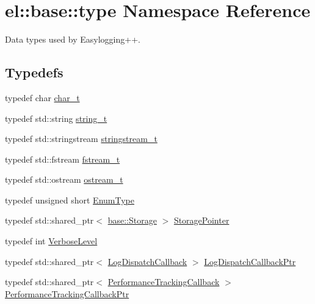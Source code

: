 \hypertarget{namespaceel_1_1base_1_1type}{}\section{el\+:\+:base\+:\+:type Namespace Reference}
\label{namespaceel_1_1base_1_1type}


Data types used by Easylogging++.  


\subsection*{Typedefs}
\begin{DoxyCompactItemize}
\item 
typedef char \hyperlink{namespaceel_1_1base_1_1type_ae9fe1ba101c2444b8cad9a2484b54907}{char\+\_\+t}
\item 
typedef std\+::string \hyperlink{namespaceel_1_1base_1_1type_a67e406cd213c231f1d135b5a4eda64b5}{string\+\_\+t}
\item 
typedef std\+::stringstream \hyperlink{namespaceel_1_1base_1_1type_a3492908c4b80f97b6c4b346d394f1302}{stringstream\+\_\+t}
\item 
typedef std\+::fstream \hyperlink{namespaceel_1_1base_1_1type_a620c830ead75d26b45c060c211ee2685}{fstream\+\_\+t}
\item 
typedef std\+::ostream \hyperlink{namespaceel_1_1base_1_1type_a74ea109bf34d1c44926837fb0830f445}{ostream\+\_\+t}
\item 
typedef unsigned short \hyperlink{namespaceel_1_1base_1_1type_afb892a99b7545bf6e45c1e1d84af2ec9}{Enum\+Type}
\item 
typedef std\+::shared\+\_\+ptr$<$ \hyperlink{classel_1_1base_1_1_storage}{base\+::\+Storage} $>$ \hyperlink{namespaceel_1_1base_1_1type_a3c34822c3825018aca1526f2289b7976}{Storage\+Pointer}
\item 
typedef int \hyperlink{namespaceel_1_1base_1_1type_a3f79fa74639a13c32f794ba074fe7fb4}{Verbose\+Level}
\item 
typedef std\+::shared\+\_\+ptr$<$ \hyperlink{classel_1_1_log_dispatch_callback}{Log\+Dispatch\+Callback} $>$ \hyperlink{namespaceel_1_1base_1_1type_a887283511935c7a6d5ca99df8099f33f}{Log\+Dispatch\+Callback\+Ptr}
\item 
typedef std\+::shared\+\_\+ptr$<$ \hyperlink{classel_1_1_performance_tracking_callback}{Performance\+Tracking\+Callback} $>$ \hyperlink{namespaceel_1_1base_1_1type_a01a715419060d65c31b71fd8d067abdd}{Performance\+Tracking\+Callback\+Ptr}
\end{DoxyCompactItemize}


